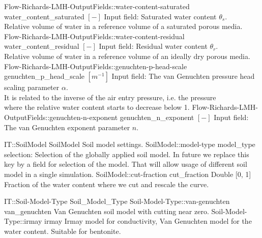 \begin{SelectionType}
{{}}
		\SelectionItem
			{Flow-Richards-LMH-OutputFields::water-content-saturated}
			{water{\_}content{\_}saturated}
			{{{}{$[-]$}{ Input field: Saturated water content }{$ \theta_s $}{.}\\{
                Relative volume of water in a reference volume of a saturated porous media.}%
}}
		\SelectionItem
			{Flow-Richards-LMH-OutputFields::water-content-residual}
			{water{\_}content{\_}residual}
			{{{}{$[-]$}{ Input field: Residual water content }{$ \theta_r $}{.}\\{
                Relative volume of water in a reference volume of an ideally dry porous media.}%
}}
		\SelectionItem
			{Flow-Richards-LMH-OutputFields::genuchten-p-head-scale}
			{genuchten{\_}p{\_}head{\_}scale}
			{{{}{$[m^{-1}]$}{ Input field: The van Genuchten pressure head scaling parameter }{$ \alpha $}{.}\\{
                It is related to the inverse of the air entry pressure, i.e. the pressure}\\{
                where the relative water content starts to decrease below 1.}%
}}
		\SelectionItem
			{Flow-Richards-LMH-OutputFields::genuchten-n-exponent}
			{genuchten{\_}n{\_}exponent}
			{{{}{$[-]$}{ Input field: The van Genuchten exponent parameter }{$ n $}{.}%
}}
\end{SelectionType}
\begin{RecordType}
	{IT::SoilModel}
	{SoilModel}
	{}%
	{}%
	{{{Soil model settings.}%
}}
		\RecKey
			{SoilModel::model-type}
			{model{\_}type}
			{{selection: }}{}
			{ }
			{{{Selection of the globally applied soil model.
In future we replace this key by a field for selection of the model.
That will allow usage of different soil model in a single simulation.}%
}}
		\RecKey
			{SoilModel::cut-fraction}
			{cut{\_}fraction}
			{{Double [0, 1]}}{}
			{ }
			{{{Fraction of the water content where we cut  and rescale the curve.}%
}}
\end{RecordType}
\begin{SelectionType}
	{IT::Soil-Model-Type}
	{Soil{\_}Model{\_}Type}
	{}
		\SelectionItem
			{Soil-Model-Type::van-genuchten}
			{van{\_}genuchten}
			{{{Van Genuchten soil model with cutting near zero.}%
}}
		\SelectionItem
			{Soil-Model-Type::irmay}
			{irmay}
			{{{Irmay model for conductivity, Van Genuchten model for the water content.
Suitable for bentonite.}%
}}
\end{SelectionType}
